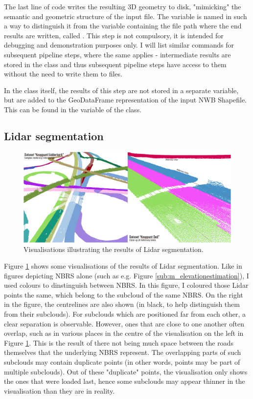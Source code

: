 The last line of code writes the resulting 3D geometry to disk, "mimicking" the semantic and geometric structure of the input file. The variable is named in such a way to distinguish it from the variable containing the file path where the end results are written, called . This step is not compulsory, it is intended for debugging and demonstration purposes only. I will list similar commands for subsequent pipeline steps, where the same applies - intermediate results are stored in the class and thus subsequent pipeline steps have access to them without the need to write them to files.

In the class itself, the results of this step are not stored in a separate variable, but are added to the GeoDataFrame representation of the input NWB Shapefile. This can be found in the  variable of the  class.

\subsection{Lidar segmentation}
\label{sub:r_lidarsegmentation}

\begin{figure}[]
    \centering
    \includegraphics[width=0.9\linewidth]{final_report/figs/lidarsegmentation0.png}
    \caption{Visualisations illustrating the results of Lidar segmentation.}
    \label{fig:lidarsegmentation0}
\end{figure}

Figure \ref{fig:lidarsegmentation0} shows some visualisations of the results of Lidar segmentation. Like in figures depicting NBRS alone (such as e.g. Figure \ref{sub:m_elevationestimation}), I used colours to dinstinguish between NBRS. In this figure, I coloured those Lidar points the same, which belong to the subcloud of the same NBRS. On the right in the figure, the centrelines are also shown (in black, to help distinguish them from their subclouds). For subclouds which are positioned far from each other, a clear separation is observable. However, ones that are close to one another often overlap, such as in various places in the centre of the visualisation on the left in Figure \ref{fig:lidarsegmentation0}. This is the result of there not being much space between the roads themselves that the underlying NBRS represent. The overlapping parts of such subclouds may contain duplicate points (in other words, points may be part of multiple subclouds). Out of these "duplicate" points, the visualisation only shows the ones that were loaded last, hence some subclouds may appear thinner in the visualisation than they are in reality.

